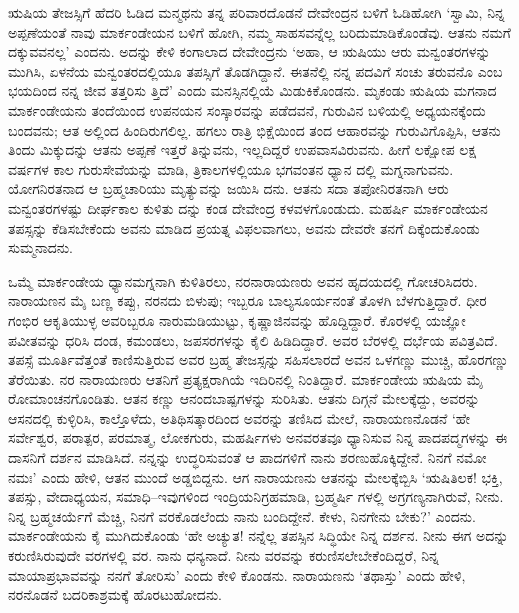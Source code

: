 ಋಷಿಯ ತೇಜಸ್ಸಿಗೆ ಹೆದರಿ ಓಡಿದ ಮನ್ಮಥನು ತನ್ನ ಪರಿವಾರದೊಡನೆ ದೇವೇಂದ್ರನ ಬಳಿಗೆ ಓಡಿಹೋಗಿ ‘ಸ್ವಾಮಿ, ನಿನ್ನ ಅಪ್ಪಣೆಯಂತೆ ನಾವು ಮಾರ್ಕಂಡೇಯನ ಬಳಿಗೆ ಹೋಗಿ, ನಮ್ಮ ಸಾಹಸವನ್ನೆಲ್ಲ ಬರಿದುಮಾಡಿಕೊಂಡೆವು. ಆತನು ನಮಗೆ ದಕ್ಕುವವನಲ್ಲ’ ಎಂದನು. ಅದನ್ನು ಕೇಳಿ ಕಂಗಾಲಾದ ದೇವೇಂದ್ರನು ‘ಅಹಾ, ಆ ಋಷಿಯು ಆರು ಮನ್ವಂತರಗಳನ್ನು ಮುಗಿಸಿ, ಏಳನೆಯ ಮನ್ವಂತರದಲ್ಲಿಯೂ ತಪಸ್ಸಿಗೆ ತೊಡಗಿದ್ದಾನೆ. ಈತನೆಲ್ಲಿ ನನ್ನ ಪದವಿಗೆ ಸಂಚು ತರುವನೊ ಎಂಬ ಭಯದಿಂದ ನನ್ನ ಜೀವ ತತ್ತರಿಸು ತ್ತಿದೆ’ ಎಂದು ಮನಸ್ಸಿನಲ್ಲಿಯೆ ಮಿಡುಕಿಕೊಂಡನು. ಮೃಕಂಡು ಋಷಿಯ ಮಗನಾದ ಮಾರ್ಕಂಡೇಯನು ತಂದೆಯಿಂದ ಉಪನಯನ ಸಂಸ್ಕಾರವನ್ನು ಪಡೆದವನೆ, ಗುರುವಿನ ಬಳಿಯಲ್ಲಿ ಅಧ್ಯಯನಕ್ಕೆಂದು ಬಂದವನು; ಆತ ಅಲ್ಲಿಂದ ಹಿಂದಿರುಗಲಿಲ್ಲ. ಹಗಲು ರಾತ್ರಿ ಭಿಕ್ಷೆಯಿಂದ ತಂದ ಆಹಾರವನ್ನು ಗುರುವಿಗೊಪ್ಪಿಸಿ, ಆತನು ತಿಂದು ಮಿಕ್ಕುದನ್ನು ಆತನು ಅಪ್ಪಣೆ ಇತ್ತರೆ ತಿನ್ನುವನು, ಇಲ್ಲದಿದ್ದರೆ ಉಪವಾಸವಿರುವನು. ಹೀಗೆ ಲಕ್ಷೋಪ ಲಕ್ಷ ವರ್ಷಗಳ ಕಾಲ ಗುರುಸೇವೆಯನ್ನು ಮಾಡಿ, ತ್ರಿಕಾಲಗಳಲ್ಲಿಯೂ ಭಗವಂತನ ಧ್ಯಾನ ದಲ್ಲಿ ಮಗ್ನನಾಗುವನು. ಯೋಗನಿರತನಾದ ಆ ಬ್ರಹ್ಮಚಾರಿಯು ಮೃತ್ಯುವನ್ನು ಜಯಿಸಿ ದನು. ಆತನು ಸದಾ ತಪೋನಿರತನಾಗಿ ಆರು ಮನ್ವಂತರಗಳಷ್ಟು ದೀರ್ಘಕಾಲ ಕುಳಿತು ದನ್ನು ಕಂಡ ದೇವೇಂದ್ರ ಕಳವಳಗೊಂಡುದು. ಮಹರ್ಷಿ ಮಾರ್ಕಂಡೇಯನ ತಪಸ್ಸನ್ನು ಕೆಡಿಸಬೇಕೆಂದು ಅವನು ಮಾಡಿದ ಪ್ರಯತ್ನ ವಿಫಲವಾಗಲು, ಅವನು ದೇವರೇ ತನಗೆ ದಿಕ್ಕೆಂದುಕೊಂಡು ಸುಮ್ಮನಾದನು.

ಒಮ್ಮೆ ಮಾರ್ಕಂಡೇಯ ಧ್ಯಾನಮಗ್ನನಾಗಿ ಕುಳಿತಿರಲು, ನರನಾರಾಯಣರು ಅವನ ಹೃದಯದಲ್ಲಿ ಗೋಚರಿಸಿದರು. ನಾರಾಯಣನ ಮೈ ಬಣ್ಣ ಕಪ್ಪು, ನರನದು ಬಿಳುಪು; ಇಬ್ಬರೂ ಬಾಲ್ಯಸೂರ್ಯನಂತೆ ತೊಳಗಿ ಬೆಳಗುತ್ತಿದ್ದಾರೆ. ಧೀರ ಗಂಭಿರ ಆಕೃತಿಯುಳ್ಳ ಅವರಿಬ್ಬರೂ ನಾರುಮಡಿಯುಟ್ಟು, ಕೃಷ್ಣಾಜಿನವನ್ನು ಹೊದ್ದಿದ್ದಾರೆ. ಕೊರಳಲ್ಲಿ ಯಜ್ಞೋ ಪವೀತವನ್ನು ಧರಿಸಿ ದಂಡ, ಕಮಂಡಲು, ಜಪಸರಗಳನ್ನು ಕೈಲಿ ಹಿಡಿದಿದ್ದಾರೆ. ಅವರ ಬೆರಳಲ್ಲಿ ದರ್ಭೆಯ ಪವಿತ್ರವಿದೆ. ತಪಸ್ಸೆ ಮೂರ್ತಿವೆತ್ತಂತೆ ಕಾಣಿಸುತ್ತಿರುವ ಅವರ ಬ್ರಹ್ಮ ತೇಜಸ್ಸನ್ನು ಸಹಿಸಲಾರದೆ ಅವನ ಒಳಗಣ್ಣು ಮುಚ್ಚಿ, ಹೊರಗಣ್ಣು ತೆರೆಯಿತು. ನರ ನಾರಾಯಣರು ಆತನಿಗೆ ಪ್ರತ್ಯಕ್ಷರಾಗಿಯೆ ಇದಿರಿನಲ್ಲಿ ನಿಂತಿದ್ದಾರೆ. ಮಾರ್ಕಂಡೇಯ ಋಷಿಯ ಮೈ ರೋಮಾಂಚನಗೊಂಡಿತು. ಆತನ ಕಣ್ಣು ಆನಂದಬಾಷ್ಪಗಳನ್ನು ಸುರಿಸಿತು. ಆತನು ದಿಗ್ಗನೆ ಮೇಲಕ್ಕೆದ್ದು, ಅವರನ್ನು ಆಸನದಲ್ಲಿ ಕುಳ್ಳಿರಿಸಿ, ಕಾಲ್ತೊಳೆದು, ಅತಿಥಿಸತ್ಕಾರದಿಂದ ಅವರನ್ನು ತಣಿಸಿದ ಮೇಲೆ, ನಾರಾಯಣನೊಡನೆ ‘ಹೇ ಸರ್ವೇಶ್ವರ, ಪರಾತ್ಪರ, ಪರಮಾತ್ಮ, ಲೋಕಗುರು, ಮಹರ್ಷಿಗಳು ಅನವರತವೂ ಧ್ಯಾನಿಸುವ ನಿನ್ನ ಪಾದಪದ್ಮಗಳನ್ನು ಈ ದಾಸನಿಗೆ ದರ್ಶನ ಮಾಡಿಸಿದೆ. ನನ್ನನ್ನು ಉದ್ಧರಿಸುವಂತೆ ಆ ಪಾದಗಳಿಗೆ ನಾನು ಶರಣುಹೊಕ್ಕಿದ್ದೇನೆ. ನಿನಗೆ ನಮೋ ನಮಃ’ ಎಂದು ಹೇಳಿ, ಆತನ ಮುಂದೆ ಅಡ್ಡಬಿದ್ದನು. ಆಗ ನಾರಾಯಣನು ಆತನನ್ನು ಮೇಲಕ್ಕೆಬ್ಬಿಸಿ ‘ಋಷಿತಿಲಕ! ಭಕ್ತಿ, ತಪಸ್ಸು, ವೇದಾಧ್ಯಯನ, ಸಮಾಧಿ–ಇವುಗಳಿಂದ ಇಂದ್ರಿಯನಿಗ್ರಹಮಾಡಿ, ಬ್ರಹ್ಮರ್ಷಿ ಗಳಲ್ಲಿ ಅಗ್ರಗಣ್ಯನಾಗಿರುವೆ, ನೀನು. ನಿನ್ನ ಬ್ರಹ್ಮಚರ್ಯೆಗೆ ಮೆಚ್ಚಿ, ನಿನಗೆ ವರಕೊಡಲೆಂದು ನಾನು ಬಂದಿದ್ದೇನೆ. ಕೇಳು, ನಿನಗೇನು ಬೇಕು?’ ಎಂದನು. ಮಾರ್ಕಂಡೇಯನು ಕೈ ಮುಗಿದುಕೊಂಡು ‘ಹೇ ಅಚ್ಯುತ! ನನ್ನೆಲ್ಲ ತಪಸ್ಸಿನ ಸಿದ್ಧಿಯೇ ನಿನ್ನ ದರ್ಶನ. ನೀನು ಈಗ ಅದನ್ನು ಕರುಣಿಸಿರುವುದೇ ವರಗಳಲ್ಲಿ ವರ. ನಾನು ಧನ್ಯನಾದೆ. ನೀನು ವರವನ್ನು ಕರುಣಿಸಲೇಬೇಕೆಂದಿದ್ದರೆ, ನಿನ್ನ ಮಾಯಾಪ್ರಭಾವವನ್ನು ನನಗೆ ತೋರಿಸು’ ಎಂದು ಕೇಳಿ ಕೊಂಡನು. ನಾರಾಯಣನು ‘ತಥಾಸ್ತು’ ಎಂದು ಹೇಳಿ, ನರನೊಡನೆ ಬದರಿಕಾಶ್ರಮಕ್ಕೆ ಹೊರಟುಹೋದನು.

